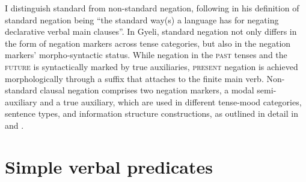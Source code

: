 \begin{table}[!h]
\centering
{}
\caption{Negation markers}
\label{Tab:NEG}
\end{table}

I distinguish standard from non-standard negation, following \citet[1]{miestamo2005} in his definition of standard negation being ``the standard way(s) a language has for negating declarative verbal main clauses''.  In Gyeli, standard negation not only differs in the form of negation markers across tense categories, but also in the negation markers' morpho-syntactic status. While negation in the \textsc{past} tenses and the \textsc{future} is syntactically marked by true auxiliaries,  \textsc{present} negation is achieved morphologically through a suffix that attaches to the finite main verb. Non-standard clausal negation comprises two negation markers, a modal semi-auxiliary and a true auxiliary, which are used in different tense-mood categories, sentence types, and information structure constructions, as outlined in detail in  and .











\section{Simple verbal predicates}
\label{sec:SimpPred}

